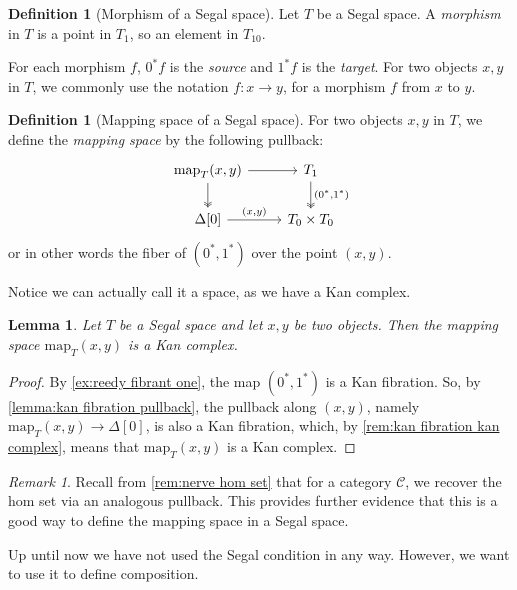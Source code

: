 \documentclass[11pt, a4paper]{amsart}
\newcommand{\cC}{\mathcal{C}}
\newcommand{\map}{\mathrm{map}}
\newtheorem{lemma}[equation]{Lemma}
\theoremstyle{definition}
\newtheorem{definition}[equation]{Definition}
\theoremstyle{remark}
\newtheorem{remark}[equation]{Remark}
\numberwithin{equation}{section}
\begin{document}
 \begin{definition}[Morphism of a Segal space] \label{def:morphisms of segal space}
  Let $T$ be a Segal space. A \emph{morphism} in $T$ is a point in $T_1$, so an element in $T_{10}$.
 \end{definition}

For each morphism $f$, $0^*f$ is the \emph{source} and $1^*f$ is the \emph{target}. For two objects $x, y$ in $T$, we commonly use the notation $f\colon x \to y$, for a morphism $f$ from $x$ to $y$. 

 \begin{definition}[Mapping space of a Segal space] \label{def:mapping space Segal}
  For two objects $x,y$ in $T$, we define the \emph{mapping space} by the following pullback: 
  \[
  \begin{tikzcd}
    \map_{T} (x,y) \arrow[r] \arrow[d, twoheadrightarrow] & T_1 \arrow[d, "{(0^*,1^*)}", twoheadrightarrow] \\
    \Delta[0] \arrow[r, "{(x,y)}"] & T_0 \times T_0
  \end{tikzcd}
  \]
  or in other words the fiber of $(0^*,1^*)$ over the point $(x,y)$.
 \end{definition}

Notice we can actually call it a space, as we have a Kan complex.

\begin{lemma} \label{lemma:mapping space kan complex}
  Let $T$ be a Segal space and let $x,y$ be two objects. Then the mapping space $\map_T(x,y)$ is a Kan complex.
\end{lemma}

\begin{proof}
 By \cref{ex:reedy fibrant one}, the map $(0^*,1^*)$ is a Kan fibration. So, by \cref{lemma:kan fibration pullback}, the pullback along $(x,y)$, namely $\map_T(x,y) \to \Delta[0]$, is also a Kan fibration, which, by \cref{rem:kan fibration kan complex}, means that $\map_T(x,y)$ is a Kan complex.
\end{proof}

\begin{remark}
 Recall from \cref{rem:nerve hom set} that for a category $\cC$, we recover the hom set via an analogous pullback. This provides further evidence that this is a good way to define the mapping space in a Segal space.
\end{remark}

Up until now we have not used the Segal condition in any way. However, we want to use it to define composition.
 
\end{document}
